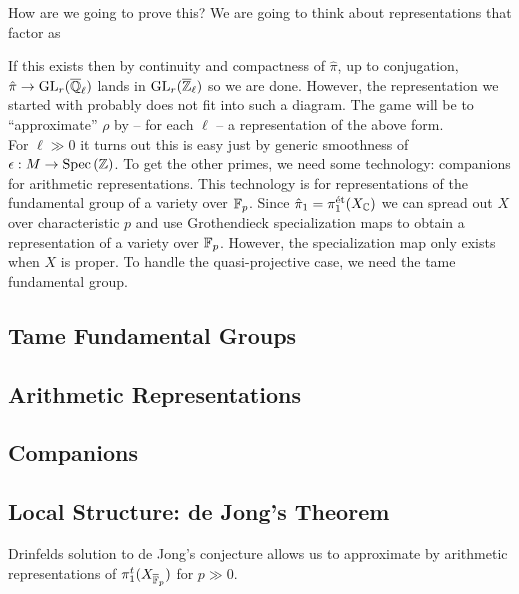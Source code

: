 \documentclass[12pt]{article}
\begin{document}
How are we going to prove this? We are going to think about representations that factor as 
\begin{center}
\end{center}
If this exists then by continuity and compactness of $\hat{\pi}$, up to conjugation, $\hat{\pi} \to \mathrm{GL}_r(\overline{\mathbb{Q}}_\ell)$ lands in $\mathrm{GL}_r(\overline{\mathbb{Z}}_\ell)$ so we are done. However, the representation we started with probably does not fit into such a diagram. The game will be to ``approximate'' $\rho$ by -- for each $\ell$ -- a representation of the above form.
\bigskip\\
For $\ell \gg 0$ it turns out this is easy just by generic smoothness of $\epsilon : M \to \mathrm{Spec}\left( \mathbb{Z} \right)$. To get the other primes, we need some technology: companions for arithmetic representations. This technology is for representations of the fundamental group of a variety over $\mathbb{F}_p$. Since $\hat{\pi}_1 = \pi_1^{\text{\'{e}t}}(X_{\mathbb{C}})$ we can spread out $X$ over characteristic $p$ and use Grothendieck specialization maps to obtain a representation of a variety over $\mathbb{F}_p$. However, the specialization map only exists when $X$ is proper. To handle the quasi-projective case, we need the tame fundamental group.

\subsection{Tame Fundamental Groups} 


\subsection{Arithmetic Representations}

\subsection{Companions}

\subsection{Local Structure: de Jong's Theorem}

Drinfelds solution to de Jong's conjecture allows us to approximate by arithmetic representations of $\pi_1^t(X_{\overline{\mathbb{F}}_p})$ for $p \gg 0$. 
\end{document}
